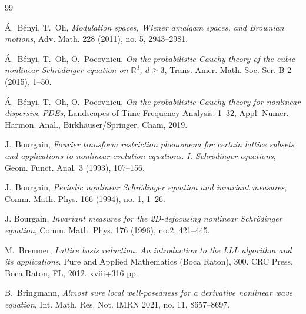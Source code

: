 \documentclass[%
11pt,  reqno]{amsart}
\newcommand{\1}{\hspace{0.2mm}\text{I}\hspace{0.2mm}}
\newcommand{\R}{\mathbb{R}}
\numberwithin{equation}{section}
\numberwithin{theorem}{section}
\begin{document}
\begin{thebibliography}{99} 







\'A.~B\'enyi, T.~Oh, 
{\it Modulation spaces, Wiener amalgam spaces, and Brownian motions}, Adv. Math. 228 (2011), no. 5, 2943--2981. 

\'A.~B\'enyi, T.~Oh, O.~Pocovnicu,
{\it On the probabilistic Cauchy theory of the cubic nonlinear Schr\"odinger equation on $\R^d$, $d\ge 3$},
 Trans. Amer. Math. Soc. Ser. B 2 (2015), 1--50. 

\'A.~B\'enyi, T.~Oh, O.~Pocovnicu,
{\it  On the probabilistic Cauchy theory for nonlinear dispersive PDEs}, Landscapes of Time-Frequency Analysis. 1--32, Appl. Numer. Harmon. Anal., Birkh\"auser/Springer, Cham, 2019. 

J.~Bourgain, 
{ \it Fourier transform restriction phenomena for certain lattice subsets and applications to nonlinear evolution equations. I. Schr\"odinger equations}, 
Geom. Funct. Anal. 3 (1993), 107--156.

J.~Bourgain, 
{\it Periodic nonlinear Schr\"odinger equation and invariant measures},
Comm. Math. Phys. 166 (1994), no. 1, 1--26.

J. Bourgain, {\it Invariant measures for the 2D-defocusing nonlinear Schr\"odinger equation}, Comm. Math. Phys. 176 (1996), no.2, 421--445.






M.~Bremner, {\it Lattice basis reduction. An introduction to the LLL algorithm and its applications}. Pure and Applied Mathematics (Boca Raton), 300. CRC Press, Boca Raton, FL, 2012. xviii+316 pp.



B.~Bringmann, 
{\it Almost sure local well-posedness for a derivative nonlinear wave equation},
 Int. Math. Res. Not. IMRN 2021, no. 11, 8657--8697.


\end{thebibliography}
\end{document}
